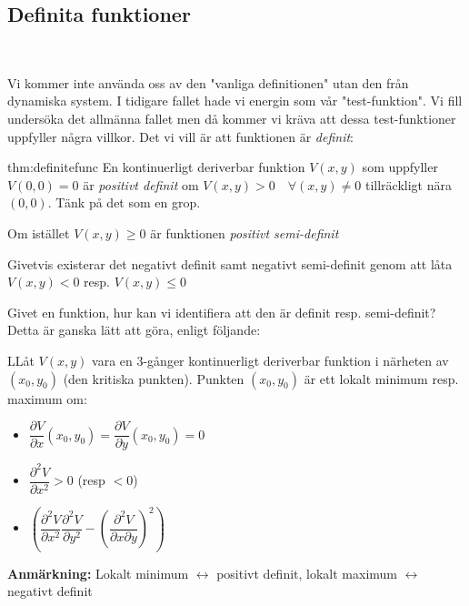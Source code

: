\subsection{Definita funktioner}\hfill\\
\par\bigskip
\noindent Vi kommer inte använda oss av den "vanliga definitionen" utan den från dynamiska system. I tidigare fallet hade vi energin som vår "test-funktion". Vi fill undersöka det allmänna fallet men då kommer vi kräva att dessa test-funktioner uppfyller några villkor. Det vi vill är att funktionen är \textit{definit}:
\par\bigskip
\begin{theo}{thm:definitefunc}
  En kontinuerligt deriverbar funktion $V(x,y)$ som uppfyller $V(0,0)=0$ är \textit{positivt definit} om $V(x,y)>0\quad\forall (x,y)\neq0$ tillräckligt nära $(0,0)$. Tänk på det som en grop.\par\bigskip
  \noindent Om istället $V(x,y)\geq0$ är funktionen \textit{positivt semi-definit}
  \par\bigskip
  \noindent Givetvis existerar det negativt definit samt negativt semi-definit genom att låta $V(x,y)<0$ resp. $V(x,y)\leq0$
\end{theo}
\par\bigskip
\noindent Givet en funktion, hur kan vi identifiera att den är definit resp. semi-definit? Detta är ganska lätt att göra, enligt följande:
\par\bigskip
\begin{theo}
  LLåt $V(x,y)$ vara en 3-gånger kontinuerligt deriverbar funktion i närheten av $(x_0,y_0)$ (den kritiska punkten). Punkten $(x_0,y_0)$ är ett lokalt minimum resp. maximum om:\par
  \begin{itemize}
    \item $\dfrac{\partial V}{\partial x}(x_0,y_0)=\dfrac{\partial V}{\partial y}(x_0,y_0)=0$
    \item $\dfrac{\partial^2V}{\partial x^2}>0$ (resp $<0$)
    \item $\left(\dfrac{\partial^2V}{\partial x^2}\dfrac{\partial^2V}{\partial y^2}-\left(\dfrac{\partial^2V}{\partial x\partial y}\right)^2\right)$
  \end{itemize}
\end{theo}
\par\bigskip
\noindent\textbf{Anmärkning:} Lokalt minimum $\leftrightarrow$ positivt definit, lokalt maximum $\leftrightarrow$ negativt definit
